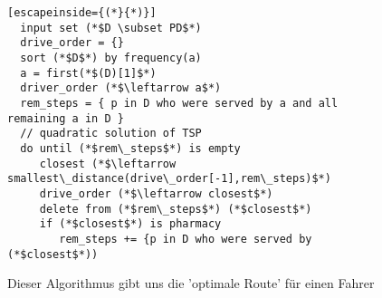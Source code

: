 \documentclass[a4]{article}
\begin{document}
\begin{figure}[h]
\begin{lstlisting}[escapeinside={(*}{*)}]
  input set (*$D \subset PD$*)
  drive_order = {}
  sort (*$D$*) by frequency(a)
  a = first(*$(D)[1]$*)
  driver_order (*$\leftarrow a$*)
  rem_steps = { p in D who were served by a and all remaining a in D }
  // quadratic solution of TSP
  do until (*$rem\_steps$*) is empty
     closest (*$\leftarrow smallest\_distance(drive\_order[-1],rem\_steps)$*)
     drive_order (*$\leftarrow closest$*)
     delete from (*$rem\_steps$*) (*$closest$*)
     if (*$closest$*) is pharmacy
        rem_steps += {p in D who were served by (*$closest$*))
\end{lstlisting}
\caption{Dieser Algorithmus gibt uns die 'optimale Route' für einen Fahrer}
\end{figure}
\end{document}
